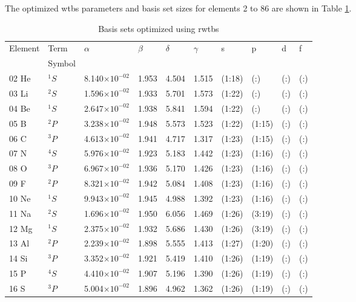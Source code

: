 \documentclass[12pt]{book}
\begin{document}
The optimized wtbs parameters and basis set sizes for elements 2 to 86 are shown in Table \ref{tab:BStab}.
\begin{center}
\singlespacing
\begin{longtable}{l l l l l l l l l l}
\caption{Basis sets optimized using rwtbs}\label{tab:BStab} \\
	Element	&	Term		&	$\alpha$	&	$\beta$	&	$\delta$	&	$\gamma$	&	s	&	p	&	d	&	f	\\
			&	Symbol	&			&			&			&				&		&		&		&		\\
\hline
02 He & $^{1}S$ & 8.140$\times10^{-02}$ & 1.953 & 4.504 & 1.515 & (1:18) & (:) & (:) & (:) \\
03 Li & $^{2}S$ & 1.596$\times10^{-02}$ & 1.933 & 5.701 & 1.573 & (1:22) & (:) & (:) & (:) \\
04 Be & $^{1}S$ & 2.647$\times10^{-02}$ & 1.938 & 5.841 & 1.594 & (1:22) & (:) & (:) & (:) \\	
05 B & $^{2}P$ & 3.238$\times10^{-02}$ & 1.948 & 5.573 & 1.523 & (1:22) & (1:15) & (:) & (:) \\
06 C & $^{3}P$ & 4.613$\times10^{-02}$ & 1.941 & 4.717 & 1.317 & (1:23) & (1:15) & (:) & (:) \\
07 N & $^{4}S$ & 5.976$\times10^{-02}$ & 1.923 & 5.183 & 1.442 & (1:23) & (1:16) & (:) & (:) \\
08 O & $^{3}P$ & 6.967$\times10^{-02}$ & 1.936 & 5.170 & 1.426 & (1:23) & (1:16) & (:) & (:) \\
09 F & $^{2}P$ & 8.321$\times10^{-02}$ & 1.942 & 5.084 & 1.408 & (1:23) & (1:16) & (:) & (:) \\
10 Ne & $^{1}S$ & 9.943$\times10^{-02}$ & 1.945 & 4.988 & 1.392 & (1:23) & (1:16) & (:) & (:) \\
11 Na & $^{2}S$ & 1.696$\times10^{-02}$ & 1.950 & 6.056 & 1.469 & (1:26) & (3:19) & (:) & (:) \\
12 Mg & $^{1}S$ & 2.375$\times10^{-02}$ & 1.932 & 5.686 & 1.430 & (1:26) & (3:19) & (:) & (:) \\
13 Al & $^{2}P$ & 2.239$\times10^{-02}$ & 1.898 & 5.555 & 1.413 & (1:27) & (1:20) & (:) & (:) \\
14 Si & $^{3}P$ & 3.352$\times10^{-02}$ & 1.921 & 5.419 & 1.410 & (1:26) & (1:19) & (:) & (:) \\
15 P & $^{4}S$ & 4.410$\times10^{-02}$ & 1.907 & 5.196 & 1.390 & (1:26) & (1:19) & (:) & (:) \\
16 S & $^{3}P$ & 5.004$\times10^{-02}$ & 1.896 & 4.962 & 1.362 & (1:26) & (1:19) & (:) & (:) \\

\end{longtable}
\end{center}
\end{document}
